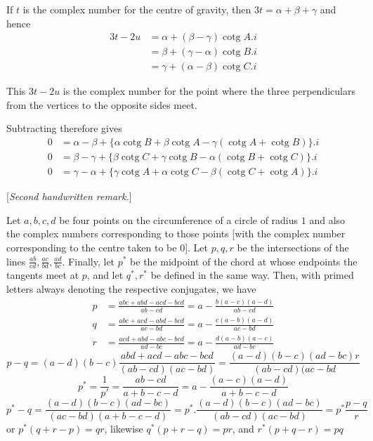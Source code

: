 %
\par
If \(t\) is the complex number for the centre of gravity, then \(3t=\alpha+\beta+\gamma\) and hence
\[
\begin{aligned}
3t-2u&=\alpha+(\beta-\gamma)\operatorname{cotg}A.i\\
&=\beta+(\gamma-\alpha)\operatorname{cotg}B.i\\
&=\gamma+(\alpha-\beta)\operatorname{cotg}C.i
\end{aligned}
\]
\par
This \(3t-2u\) is the complex number for the point where the three perpendiculars from the vertices to the opposite sides meet.

Subtracting therefore gives
\[
\begin{aligned}
0&=\alpha-\beta+\{\alpha\operatorname{cotg}B+\beta\operatorname{cotg}A-\gamma(\operatorname{cotg}A+\operatorname{cotg}B)\}.i\\
0&=\beta-\gamma+\{\beta\operatorname{cotg}C+\gamma\operatorname{cotg}B-\alpha(\operatorname{cotg}B+\operatorname{cotg}C)\}.i\\
0&=\gamma-\alpha+\{\gamma\operatorname{cotg}A+\alpha\operatorname{cotg}C-\beta(\operatorname{cotg}C+\operatorname{cotg}A)\}.i
\end{aligned}
\]
\par\medskip{}
\begin{center}[\textit{Second handwritten remark.}]\end{center}
\hspace*{\parindent}Let \(a,b,c,d\) be four points on the circumference of a circle of radius \(1\) and also the complex numbers corresponding to those points [with the complex number corresponding to the centre taken to be \(0\)]. Let \(p,q,r\) be the intersections of the lines \(\tfrac{ab}{cd},\tfrac{ac}{bd},\tfrac{ad}{bc}\). Finally, let \(p^*\) be the midpoint of the chord at whose endpoints the tangents meet at \(p\), and let \(q^*,r^*\) be defined in the same way. Then, with primed letters always denoting the respective conjugates, we have
\[
\begin{aligned}
p&=\frac{abc+abd-acd-bcd}{ab-cd}=a-\frac{b(a-c)(a-d)}{ab-cd}\\
q&=\frac{abc+acd-abd-bcd}{ac-bd}=a-\frac{c(a-b)(a-d)}{ac-bd}\\
r&=\frac{acd+abd-abc-bcd}{ad-bc}=a-\frac{d(a-b)(a-c)}{ad-bc}
\end{aligned}
\]
\[
p-q=(a-d)(b-c)\frac{abd+acd-abc-bcd}{(ab-cd)(ac-bd)}=\frac{(a-d)(b-c)(ad-bc)r}{(ab-cd)(ac-bd}
\]
\[
p^*=\frac1{p'}=\frac{ab-cd}{a+b-c-d}=a-\frac{(a-c)(a-d)}{a+b-c-d}
\]
\begingroup\footnotesize
\[
p^*-q=\frac{(a-d)(b-c)(ad-bc)}{(ac-bd)(a+b-c-d)}=p^*.\frac{(a-d)(b-c)(ad-bc)}{(ab-cd)(ac-bd)}=p^*\frac{p-q}{r}
\]
\endgroup
or \(p^*(q+r-p)=qr\), likewise \(q^*(p+r-q)=pr\), and \(r^*(p+q-r)=pq\)
